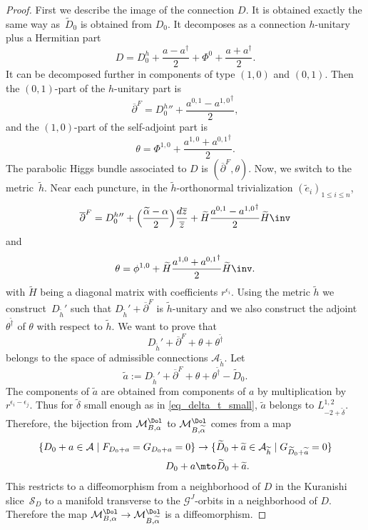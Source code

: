 \begin{proof}
First we describe the image of the connection $D$. It is obtained exactly the same way as~$\widetilde{D}_0$ is obtained from $D_0$. It decomposes as a connection $h$-unitary plus a Hermitian part
\[
D= D_{0}^h+ \frac{a-a^{\dagger}}{2} + \Phi^0 +\frac{a + a^{\dagger}}{2}.
\]
It can be decomposed further in components of type $(1,0)$ and $(0,1)$. Then the $(0,1)$-part of the $h$-unitary part is
\[
\overline{\partial}^F={D_{0}^h}{}''+ \frac{a^{0,1}-{a^{1,0}}^{\dagger}}{2},
\]
and the $(1,0)$-part of the self-adjoint part is
\[
\theta = \Phi^{1,0} + \frac{a^{1,0}+{a^{0,1}}^{\dagger}}{2}.
\]
The parabolic Higgs bundle associated to $D$ is $(\overline{\partial}^F,\theta)$. Now, we switch to the metric~$\widetilde{h}$. Near each puncture, in the $\widetilde{h}$-orthonormal trivialization $(\widetilde{e}_i)_{1\le i\le n}$,
\[
\overline{\partial}^F= {D_{0}^h}{}'' +\Bigl(\frac{\widetilde{\alpha}-\alpha}{2}\Bigr)\frac{d\overline{z}}{\overline{z}} + \widetilde{H} \frac{a^{0,1}-{a^{1,0}}^{\dagger}}{2} \widetilde{H} \inv
\]
and
\[
\theta = \phi^{1,0} + \widetilde{H}\frac{a^{1,0}+{a^{0,1}}^{\dagger}}{2} \widetilde{H}\inv.
\]
with $\widetilde{H}$ being a diagonal matrix with coefficients $r^{\epsilon_i}$. Using the metric $\widetilde{h}$ we construct~$D_{\widetilde{h}}'$ such that $D_{\widetilde{h}}'+\overline{\partial}^F$ is $\widetilde{h}$-unitary and we also construct the adjoint $\theta^{\widetilde{\dagger}}$ of $\theta$ with respect to $\widetilde{h}$. We want to prove that
\[
D_{\widetilde{h}}'+\overline{\partial}^F+\theta + \theta^{\widetilde{\dagger}}
\]
belongs to the space of admissible connections $\mathcal{A}_{\widetilde{h}}$. Let
\[
\widetilde{a}:=D_{\widetilde{h}}'+\overline{\partial}^F+\theta + \theta^{\widetilde{\dagger}} - \widetilde{D}_0.
\]
The components of $\widetilde{a}$ are obtained from components of $a$ by multiplication by $r^{\epsilon_i-\epsilon_j}$. Thus for $\widetilde{\delta}$ small enough as in \eqref{eq_delta_t_small}, $\widetilde{a}$ belongs to $L^{1,2}_{-2+\widetilde{\delta}}$. Therefore, the bijection from $\mathcal{M}^{\Dol}_{B,\alpha}$ to $\mathcal{M}^{\Dol}_{B,\widetilde{\alpha}}$ comes from a map
\begin{align*}
\lbrace D_0 + a \in \mathcal{A} \mid F_{D_0+a} = G_{D_0+a}= 0\rbrace & \to\lbrace \widetilde{D}_0 + \widetilde{a} \in \mathcal{A}_{\widetilde{h}} \mid G_{\widetilde{D}_0 + \widetilde{a}}= 0\rbrace \\
D_0 + a & \mto \widetilde{D}_0 + \widetilde{a}.
\end{align*}
This restricts to a diffeomorphism from a neighborhood of $D$ in the Kuranishi slice~$\mathcal{S}_D$ to a manifold transverse to the $\mathcal{G}^J$-orbits in a neighborhood of $D$. Therefore the map $\mathcal{M}_{B,\alpha}^{\Dol}\to \mathcal{M}_{B,\widetilde{\alpha}}^{\Dol}$ is a diffeomorphism.
\end{proof}

